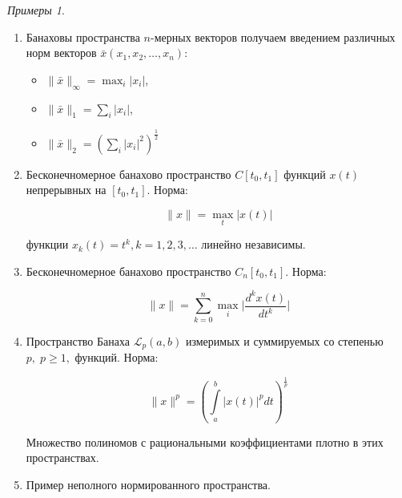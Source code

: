 \documentclass[12pt,a4paper,titlepage,oneside]{book}
\theoremstyle{definition}
\theoremstyle{plain}
\theoremstyle{remark}
\theoremstyle{remark}
\theoremstyle{remark}
\newtheorem*{examples}{Примеры}
\theoremstyle{remark}
\theoremstyle{plain}
\theoremstyle{plain}
\begin{document}
\begin{examples}
\leavevmode
\begin{enumerate}

	\item Банаховы пространства $n$-мерных векторов получаем введением различных норм векторов $\bar{x}(x_1,x_2,\ldots,x_n)$:

	\begin{itemize}

		\item $\lVert \bar{x}\rVert_\infty=\displaystyle\max_{i}\lvert x_i\rvert$,

		\item $\lVert \bar{x}\rVert_1 = \displaystyle\sum_{i}\lvert x_i\rvert$,

		\item $\lVert \bar{x}\rVert_2 = (\displaystyle\sum_{i}\lvert x_i\rvert^2)^{\frac{1}{2}}$

	\end{itemize}

	\item Бесконечномерное банахово пространство $C[t_0,t_1]$ функций $x(t)$ непрерывных на $[t_0,t_1]$. Норма:

	\begin{equation*}
	\lVert x\rVert = \displaystyle\max_{t}\lvert x(t)\rvert
	\end{equation*}

	функции $x_k(t)=t^k, k=1,2,3,\ldots$ линейно независимы.

	\item Бесконечномерное банахово пространство $C_n[t_0,t_1]$. Норма:

	\begin{equation*}
	\lVert x\rVert = \displaystyle\sum_{k=0}^n\max_{i}\lvert\frac{d^kx(t)}{dt^k}\rvert
	\end{equation*}

	\item Пространство Банаха $\mathcal{L}_p(a,b)$ измеримых и суммируемых со степенью $p,\;p \geqslant 1,$ функций. Норма:

	\begin{equation*}
	\lVert x\rVert^p = (\int\limits_a^b\lvert x(t)\rvert^pdt)^{\frac{1}{p}}
	\end{equation*}

	Множество полиномов с рациональными коэффициентами плотно в этих пространствах.

	\item Пример неполного нормированного пространства.


\end{enumerate}
\end{examples}
\end{document}
